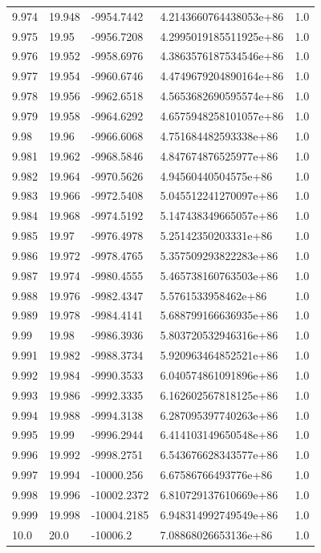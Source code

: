 \begin{tabular}{lllll}
9.974 & 19.948 & -9954.7442 & 4.2143660764438053e+86 & 1.0 \\
9.975 & 19.95 & -9956.7208 & 4.2995019185511925e+86 & 1.0 \\
9.976 & 19.952 & -9958.6976 & 4.3863576187534546e+86 & 1.0 \\
9.977 & 19.954 & -9960.6746 & 4.4749679204890164e+86 & 1.0 \\
9.978 & 19.956 & -9962.6518 & 4.5653682690595574e+86 & 1.0 \\
9.979 & 19.958 & -9964.6292 & 4.6575948258101057e+86 & 1.0 \\
9.98 & 19.96 & -9966.6068 & 4.751684482593338e+86 & 1.0 \\
9.981 & 19.962 & -9968.5846 & 4.847674876525977e+86 & 1.0 \\
9.982 & 19.964 & -9970.5626 & 4.94560440504575e+86 & 1.0 \\
9.983 & 19.966 & -9972.5408 & 5.045512241270097e+86 & 1.0 \\
9.984 & 19.968 & -9974.5192 & 5.147438349665057e+86 & 1.0 \\
9.985 & 19.97 & -9976.4978 & 5.25142350203331e+86 & 1.0 \\
9.986 & 19.972 & -9978.4765 & 5.357509293822283e+86 & 1.0 \\
9.987 & 19.974 & -9980.4555 & 5.465738160763503e+86 & 1.0 \\
9.988 & 19.976 & -9982.4347 & 5.5761533958462e+86 & 1.0 \\
9.989 & 19.978 & -9984.4141 & 5.688799166636935e+86 & 1.0 \\
9.99 & 19.98 & -9986.3936 & 5.803720532946316e+86 & 1.0 \\
9.991 & 19.982 & -9988.3734 & 5.920963464852521e+86 & 1.0 \\
9.992 & 19.984 & -9990.3533 & 6.040574861091896e+86 & 1.0 \\
9.993 & 19.986 & -9992.3335 & 6.162602567818125e+86 & 1.0 \\
9.994 & 19.988 & -9994.3138 & 6.287095397740263e+86 & 1.0 \\
9.995 & 19.99 & -9996.2944 & 6.414103149650548e+86 & 1.0 \\
9.996 & 19.992 & -9998.2751 & 6.543676628343577e+86 & 1.0 \\
9.997 & 19.994 & -10000.256 & 6.67586766493776e+86 & 1.0 \\
9.998 & 19.996 & -10002.2372 & 6.810729137610669e+86 & 1.0 \\
9.999 & 19.998 & -10004.2185 & 6.948314992749549e+86 & 1.0 \\
10.0 & 20.0 & -10006.2 & 7.08868026653136e+86 & 1.0 \\
\bottomrule
\end{tabular}
